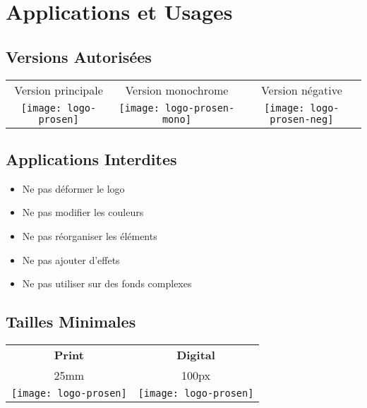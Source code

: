 \documentclass[11pt,a4paper]{report}
\begin{document}
\chapter{Applications et Usages}

\section{Versions Autorisées}

\begin{tcolorbox}[title=Déclinaisons Officielles]
\begin{center}
\begin{tabular}{ccc}
Version principale & Version monochrome & Version négative \\
\texttt{[image: logo-prosen]} & 
\texttt{[image: logo-prosen-mono]} & 
\texttt{[image: logo-prosen-neg]}
\end{tabular}
\end{center}
\end{tcolorbox}

\section{Applications Interdites}

\begin{tcolorbox}[title=Usages Prohibés]
\begin{itemize}[label=]
    \item Ne pas déformer le logo
    \item Ne pas modifier les couleurs
    \item Ne pas réorganiser les éléments
    \item Ne pas ajouter d'effets
    \item Ne pas utiliser sur des fonds complexes
\end{itemize}
\end{tcolorbox}

\section{Tailles Minimales}

\begin{tcolorbox}[title=Dimensions Minimales]
\begin{center}
\begin{tabular}{cc}
\textbf{Print} & \textbf{Digital} \\
25mm & 100px \\
\texttt{[image: logo-prosen]} & 
\texttt{[image: logo-prosen]}
\end{tabular}
\end{center}
\end{tcolorbox}
\end{document}
